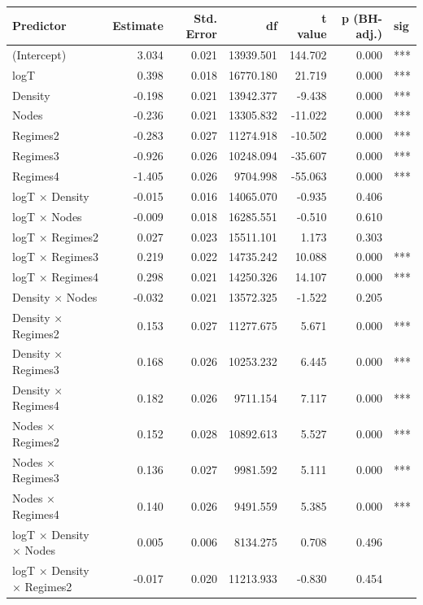 \begin{table}[ht]
\centering
\begin{tabular}{lrrrrrl}
  \hline
Predictor & Estimate & Std. Error & df & t value & p (BH-adj.) & sig \\ 
  \hline
(Intercept) & 3.034 & 0.021 & 13939.501 & 144.702 & 0.000 & *** \\ 
  logT & 0.398 & 0.018 & 16770.180 & 21.719 & 0.000 & *** \\ 
  Density & -0.198 & 0.021 & 13942.377 & -9.438 & 0.000 & *** \\ 
  Nodes & -0.236 & 0.021 & 13305.832 & -11.022 & 0.000 & *** \\ 
  Regimes2 & -0.283 & 0.027 & 11274.918 & -10.502 & 0.000 & *** \\ 
  Regimes3 & -0.926 & 0.026 & 10248.094 & -35.607 & 0.000 & *** \\ 
  Regimes4 & -1.405 & 0.026 & 9704.998 & -55.063 & 0.000 & *** \\ 
  logT × Density & -0.015 & 0.016 & 14065.070 & -0.935 & 0.406 &  \\ 
  logT × Nodes & -0.009 & 0.018 & 16285.551 & -0.510 & 0.610 &  \\ 
  logT × Regimes2 & 0.027 & 0.023 & 15511.101 & 1.173 & 0.303 &  \\ 
  logT × Regimes3 & 0.219 & 0.022 & 14735.242 & 10.088 & 0.000 & *** \\ 
  logT × Regimes4 & 0.298 & 0.021 & 14250.326 & 14.107 & 0.000 & *** \\ 
  Density × Nodes & -0.032 & 0.021 & 13572.325 & -1.522 & 0.205 &  \\ 
  Density × Regimes2 & 0.153 & 0.027 & 11277.675 & 5.671 & 0.000 & *** \\ 
  Density × Regimes3 & 0.168 & 0.026 & 10253.232 & 6.445 & 0.000 & *** \\ 
  Density × Regimes4 & 0.182 & 0.026 & 9711.154 & 7.117 & 0.000 & *** \\ 
  Nodes × Regimes2 & 0.152 & 0.028 & 10892.613 & 5.527 & 0.000 & *** \\ 
  Nodes × Regimes3 & 0.136 & 0.027 & 9981.592 & 5.111 & 0.000 & *** \\ 
  Nodes × Regimes4 & 0.140 & 0.026 & 9491.559 & 5.385 & 0.000 & *** \\ 
  logT × Density × Nodes & 0.005 & 0.006 & 8134.275 & 0.708 & 0.496 &  \\ 
  logT × Density × Regimes2 & -0.017 & 0.020 & 11213.933 & -0.830 & 0.454 &  \\ 

\end{tabular}
\end{table}
